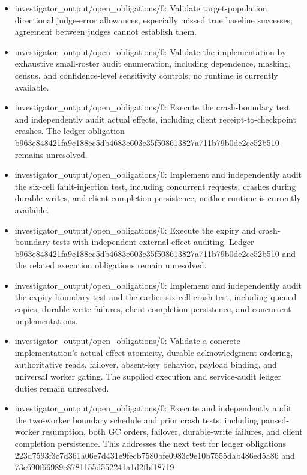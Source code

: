 \documentclass[11pt]{article}
\begin{document}
\begin{itemize}
\item investigator\_output/open\_obligations/0: Validate target-population directional judge-error allowances, especially missed true baseline successes; agreement between judges cannot establish them.
\item investigator\_output/open\_obligations/0: Validate the implementation by exhaustive small-roster audit enumeration, including dependence, masking, census, and confidence-level sensitivity controls; no runtime is currently available.
\item investigator\_output/open\_obligations/0: Execute the crash-boundary test and independently audit actual effects, including client receipt-to-checkpoint crashes. The ledger obligation b963e848421fa9e188ec5db4683e603e35f508613827a711b79b0de2cc52b510 remains unresolved.
\item investigator\_output/open\_obligations/0: Implement and independently audit the six-cell fault-injection test, including concurrent requests, crashes during durable writes, and client completion persistence; neither runtime is currently available.
\item investigator\_output/open\_obligations/0: Execute the expiry and crash-boundary tests with independent external-effect auditing. Ledger b963e848421fa9e188ec5db4683e603e35f508613827a711b79b0de2cc52b510 and the related execution obligations remain unresolved.
\item investigator\_output/open\_obligations/0: Implement and independently audit the expiry-boundary test and the earlier six-cell crash test, including queued copies, durable-write failures, client completion persistence, and concurrent implementations.
\item investigator\_output/open\_obligations/0: Validate a concrete implementation's actual-effect atomicity, durable acknowledgment ordering, authoritative reads, failover, absent-key behavior, payload binding, and universal worker gating. The supplied execution and service-audit ledger duties remain unresolved.
\item investigator\_output/open\_obligations/0: Execute and independently audit the two-worker boundary schedule and prior crash tests, including paused-worker resumption, both GC orders, failover, durable-write failures, and client completion persistence. This addresses the next test for ledger obligations 223d7593f3c7d361a06e7d431e9fecb7580bfe0983c9e10b7555dab486ed5a86 and 73c690f66989c8781155d552241a1d2fbf18719
\end{itemize}
\end{document}
